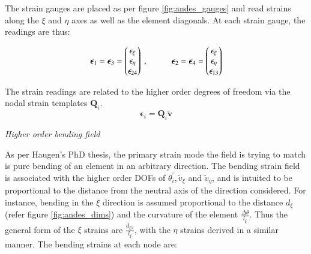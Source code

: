 The strain gauges are placed as per figure \ref{fig:andes_gauges} and read strains along the $\xi$ and $\eta$ axes as well as the element diagonals. At each strain gauge, the readings are thus:

\begin{equation} 
\boldsymbol{\epsilon}_{1} = \boldsymbol{\epsilon}_{3} =
\begin{pmatrix}
\epsilon_\xi \\
\epsilon_\eta \\
\epsilon_{24}
\end{pmatrix}
\ ,
\hspace{10mm}
\boldsymbol{\epsilon}_{2} = \boldsymbol{\epsilon}_{4} =
\begin{pmatrix}
\epsilon_\xi \\
\epsilon_\eta \\
\epsilon_{13}
\end{pmatrix}
\label{eqnAndesStrainGauges}
\end{equation}

The strain readings are related to the higher order degrees of freedom via the nodal strain templates $\mathbf{Q}_i$.
\begin{equation} 
\boldsymbol{\epsilon}_{i} = \mathbf{Q}_i \widetilde{\mathbf{v}}
\label{eqnAndesHigherOrderStrains}
\end{equation}

\textit{Higher order bending field}

As per Haugen's PhD thesis, the primary strain mode the field is trying to match is pure bending of an element in an arbitrary direction. The bending strain field is associated with the higher order DOFs of $\theta_i^{'}, \widetilde{v}_{\xi}$ and $\widetilde{v}_{\eta}$, and is intuited to be proportional to the distance from the neutral axis of the direction considered. For instance, bending in the $\xi$ direction is assumed proportional to the distance $d_{\xi}$ (refer figure \ref{fig:andes_dims}) and the curvature of the element $\frac{\Delta \theta}{l_{\xi}}$. Thus the general form of the $\xi$ strains are $\frac{d_{\xi | i}}{l_\xi}$, with the $\eta$ strains derived in a similar manner. The bending strains at each node are:

